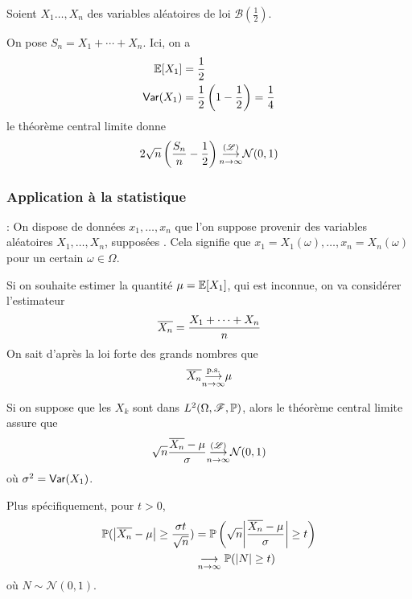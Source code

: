 \begin{example}
    Soient \(X_1\ldots,X_n\) des variables aléatoires \iid{} de loi \(\mathcal B\left(\frac12\right)\).
    
    On pose \(S_n = X_1+\cdots+X_n\). Ici, on a
    \begin{equation*}
        \begin{aligned}
            \mathbb{E}[X_1] &= \frac12\\
            \operatorname{\mathsf{Var}}(X_1) &= \frac12\left(1-\frac12\right) = \frac14
        \end{aligned}
    \end{equation*}
    le théorème central limite donne
    \begin{equation*}
        2\sqrt{n} \left(\frac{S_n}{n}-\frac12\right) \underset{n\to\infty}{{\overset{(\mathscr{L})}{\longrightarrow}}} \mathcal N(0,1)
    \end{equation*}
\end{example}

\subsubsection*{Application à la statistique}

\ptr{} : On dispose de données 
\(x_1,\ldots,x_n\) que l'on suppose provenir des variables aléatoires
\(X_1,\ldots,X_n\), supposées \iid{}. Cela signifie que
\(x_1 = X_1(\omega),\ldots,x_n = X_n(\omega)\) pour un certain
\(\omega\in\Omega\).

Si on souhaite estimer la quantité \(\mu = \mathbb{E}[X_1]\),
qui est inconnue, on va considérer l'estimateur
\begin{equation*}
    \overline{X_n} = \frac{X_1+\cdots+X_n}{n}
\end{equation*}
On sait d'après la loi forte des grands nombres que
\begin{equation*}
    \overline{X_n} \underset{n\to\infty}{{\overset{\text{p.s.}}{\longrightarrow}}} \mu
\end{equation*}

Si on suppose que les \(X_k\) sont dans \(L^2(\Omega,\mathscr{F},\mathbb{P})\),
alors le théorème central limite assure que
\begin{equation*}
    \sqrt{n}\frac{\overline{X_n}-\mu}{\sigma} \underset{n\to\infty}{{\overset{(\mathscr{L})}{\longrightarrow}}} \mathcal N(0,1)
\end{equation*}
où \(\sigma^2 = \operatorname{\mathsf{Var}}(X_1)\).

Plus spécifiquement, pour \(t>0\),
\begin{equation*}
    \begin{aligned}
        \mathbb{P}(\mathopen{}\left|\overline{X_n}-\mu\right|\mathclose{}\geq \frac{\sigma t}{\sqrt{n}})
        &= \mathbb{P}\left(\sqrt{n} \mathopen{}\left|\frac{\overline{X_n}-\mu}{\sigma}\right|\mathclose{}\geq t\right)\\
        &\underset{n\to\infty}{\longrightarrow} \mathbb{P}(\mathopen{}\left|N\right|\mathclose{}\geq t)
    \end{aligned}
\end{equation*}
où \(N\sim\mathcal N(0,1)\).

